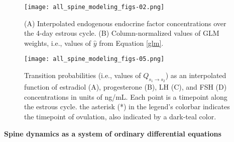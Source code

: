 \documentclass[11pt]{article}
\begin{document}
\begin{figure}
	\centering
	\texttt{[image: all\_spine\_modeling\_figs-02.png]}
	\caption{(A) Interpolated endogenous endocrine factor concentrations over the 4-day estrous cycle. (B) Column-normalized values of GLM weights, i.e., values of $\hat{y}$ from Equation \ref{glm}.}
	\label{glmfig}
\end{figure}

\begin{figure}
	\centering
	\texttt{[image: all\_spine\_modeling\_figs-05.png]}
	\caption{Transition probabilities (i.e., values of $Q_{s_1\to s_2}$) as an interpolated function of estradiol (A), progesterone (B), LH (C), and FSH (D) concentrations in units of ng/mL. Each point is a timepoint along the estrous cycle. the asterisk (*) in the legend's colorbar indicates the timepoint of ovulation, also indicated by a dark-teal color.}
	\label{probvsconc}
\end{figure}

\vspace{10pt}
\noindent \textbf{Spine dynamics as a system of ordinary differential equations}
\end{document}
